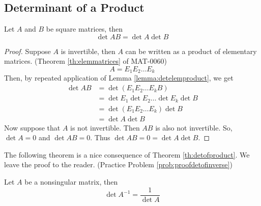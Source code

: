 \documentclass{ximera}
\begin{document}
\subsection*{Determinant of a Product}
\begin{theorem}\label{th:detofproduct}
Let $A$ and $B$ be square matrices, then
$$\det{AB}=\det{A}\det{B}$$
\end{theorem}
\begin{proof}
Suppose $A$ is invertible, then $A$ can be written as a product of elementary matrices. (Theorem \ref{th:elemmatrices} of MAT-0060) 
$$A=E_1E_2\ldots E_k$$
Then, by repeated application of Lemma \ref{lemma:detelemproduct}, we get
\begin{align*}\det{AB}&=\det{(E_1E_2\ldots E_kB)}\\
&=\det{E_1}\det{E_2}\ldots \det{E_k}\det{B}\\
&=\det{(E_1E_2\ldots E_k)}\det{B}\\
&=\det{A}\det{B}
\end{align*}
Now suppose that $A$ is not invertible.  Then $AB$ is also not invertible. %
So, $\det{A}=0$ and $\det{AB}=0$.  Thus  $\det{AB}=0=\det{A}\det{B}$.
\end{proof}
The following theorem is a nice consequence of Theorem \ref{th:detofproduct}.  We leave the proof to the reader. (Practice Problem \ref{prob:proofdetofinverse})
\begin{theorem}\label{th:detofinverse} Let $A$ be a nonsingular matrix, then
$$\det{A^{-1}}=\frac{1}{\det{A}}$$
\end{theorem}
\end{document}
